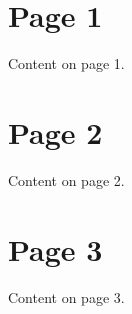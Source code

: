 \documentclass{article}
\begin{document}
\section{Page 1}

Content on page 1.

\newpage

\section{Page 2}

Content on page 2.

\newpage

\section{Page 3}

Content on page 3.
\end{document}
